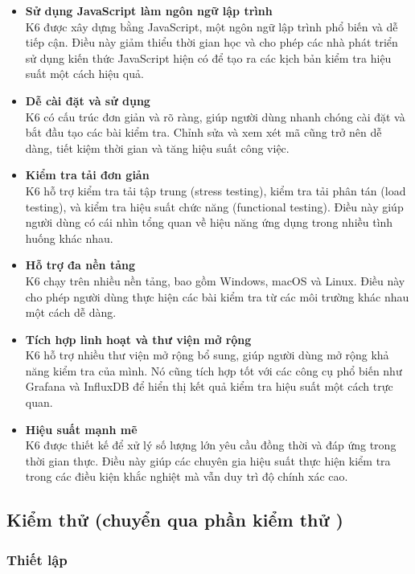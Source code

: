 \begin{itemize}
    \item \textbf{Sử dụng JavaScript làm ngôn ngữ lập trình}\\
    K6 được xây dựng bằng JavaScript, một ngôn ngữ lập trình phổ biến và dễ tiếp cận. Điều này giảm thiểu thời gian học và cho phép các nhà phát triển sử dụng kiến thức JavaScript hiện có để tạo ra các kịch bản kiểm tra hiệu suất một cách hiệu quả.
    \item \textbf{Dễ cài đặt và sử dụng}\\
    K6 có cấu trúc đơn giản và rõ ràng, giúp người dùng nhanh chóng cài đặt và bắt đầu tạo các bài kiểm tra. Chỉnh sửa và xem xét mã cũng trở nên dễ dàng, tiết kiệm thời gian và tăng hiệu suất công việc.
     \item \textbf{Kiểm tra tải đơn giản}\\
     K6 hỗ trợ kiểm tra tải tập trung (stress testing), kiểm tra tải phân tán (load testing), và kiểm tra hiệu suất chức năng (functional testing). Điều này giúp người dùng có cái nhìn tổng quan về hiệu năng ứng dụng trong nhiều tình huống khác nhau.
     \item \textbf{Hỗ trợ đa nền tảng}\\
     K6 chạy trên nhiều nền tảng, bao gồm Windows, macOS và Linux. Điều này cho phép người dùng thực hiện các bài kiểm tra từ các môi trường khác nhau một cách dễ dàng.
     \item \textbf{Tích hợp linh hoạt và thư viện mở rộng}\\
     K6 hỗ trợ nhiều thư viện mở rộng bổ sung, giúp người dùng mở rộng khả năng kiểm tra của mình. Nó cũng tích hợp tốt với các công cụ phổ biến như Grafana và InfluxDB để hiển thị kết quả kiểm tra hiệu suất một cách trực quan.
     \item \textbf{Hiệu suất mạnh mẽ}\\
     K6 được thiết kế để xử lý số lượng lớn yêu cầu đồng thời và đáp ứng trong thời gian thực. Điều này giúp các chuyên gia hiệu suất thực hiện kiểm tra trong các điều kiện khắc nghiệt mà vẫn duy trì độ chính xác cao.
\end{itemize}

\subsection{Kiểm thử (chuyển qua phần kiểm thử )}
\subsubsection{Thiết lập}

